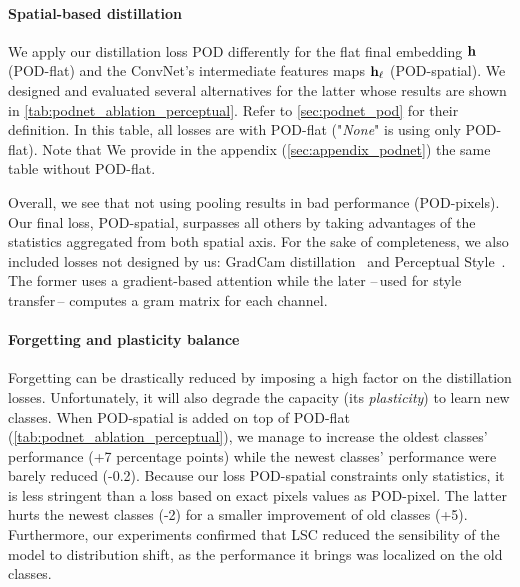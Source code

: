 \label{sec:podnet_ablation_pooling}
\paragraph{Spatial-based distillation} We apply our distillation loss \ac{POD} differently for the
flat final embedding $\mathbf{h}$ (POD-flat) and the \ac{ConvNet}'s intermediate features maps $\mathbf{h}_\ell$
(POD-spatial). We designed and evaluated several alternatives for the latter whose results are shown
in \autoref{tab:podnet_ablation_perceptual}. Refer to \autoref{sec:podnet_pod} for their definition.
In this table, all losses are with POD-flat ("\textit{None}" is using only POD-flat). Note that We
provide in the appendix (\autoref{sec:appendix_podnet}) the same table without POD-flat.

Overall, we see that not using pooling results in bad performance (POD-pixels). Our final loss,
POD-spatial, surpasses all others by taking advantages of the statistics aggregated from both
spatial axis. For the sake of completeness, we also included losses not designed by us: GradCam
distillation~\citep{dhar2019learning_without_memorizing_gradcam} and Perceptual
Style~\citep{johnson2016perceptual_losses}. The former uses a gradient-based attention while the
later --\,used for style transfer\,-- computes a gram matrix for each channel.

\paragraph{Forgetting and plasticity balance} Forgetting can be drastically reduced by imposing a
high factor on the distillation losses. Unfortunately, it will also degrade the capacity (its
\textit{plasticity}) to learn new classes. When POD-spatial is added on top of POD-flat
(\autoref{tab:podnet_ablation_perceptual}), we manage to increase the oldest classes' performance
(+7 percentage points) while the newest classes' performance were barely reduced (-0.2\pp). Because
our loss POD-spatial constraints only statistics, it is less stringent than a loss based on exact
pixels values as POD-pixel. The latter hurts the newest classes (-2\pp) for a smaller improvement of
old classes (+5\pp). Furthermore, our experiments confirmed that \ac{LSC} reduced the sensibility of
the model to distribution shift, as the performance it brings was localized on the old classes.

\label{sec:podnet_robustness}
